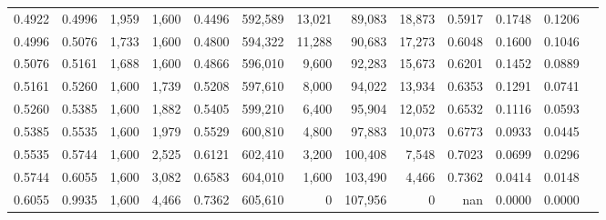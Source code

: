 \begin{tabular}{rrrrrrrrrrrrr}
0.4922 & 0.4996 &  1,959 & 1,600 &                                     0.4496 & 592,589 &  13,021 &  89,083 &  18,873 & 0.5917 & 0.1748 & 0.1206 \\
0.4996 & 0.5076 &  1,733 & 1,600 &                                     0.4800 & 594,322 &  11,288 &  90,683 &  17,273 & 0.6048 & 0.1600 & 0.1046 \\
0.5076 & 0.5161 &  1,688 & 1,600 &                                     0.4866 & 596,010 &   9,600 &  92,283 &  15,673 & 0.6201 & 0.1452 & 0.0889 \\
0.5161 & 0.5260 &  1,600 & 1,739 &                                     0.5208 & 597,610 &   8,000 &  94,022 &  13,934 & 0.6353 & 0.1291 & 0.0741 \\
0.5260 & 0.5385 &  1,600 & 1,882 &                                     0.5405 & 599,210 &   6,400 &  95,904 &  12,052 & 0.6532 & 0.1116 & 0.0593 \\
0.5385 & 0.5535 &  1,600 & 1,979 &                                     0.5529 & 600,810 &   4,800 &  97,883 &  10,073 & 0.6773 & 0.0933 & 0.0445 \\
0.5535 & 0.5744 &  1,600 & 2,525 &                                     0.6121 & 602,410 &   3,200 & 100,408 &   7,548 & 0.7023 & 0.0699 & 0.0296 \\
0.5744 & 0.6055 &  1,600 & 3,082 &                                     0.6583 & 604,010 &   1,600 & 103,490 &   4,466 & 0.7362 & 0.0414 & 0.0148 \\
0.6055 & 0.9935 &  1,600 & 4,466 &                                     0.7362 & 605,610 &       0 & 107,956 &       0 &    nan & 0.0000 & 0.0000 \\
\bottomrule
\end{tabular}
